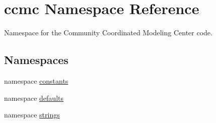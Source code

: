 \hypertarget{namespaceccmc}{\section{ccmc Namespace Reference}
\label{namespaceccmc}
}


Namespace for the Community Coordinated Modeling Center code.  


\subsection*{Namespaces}
\begin{DoxyCompactItemize}
\item 
namespace \hyperlink{namespaceccmc_1_1constants}{constants}
\item 
namespace \hyperlink{namespaceccmc_1_1defaults}{defaults}
\item 
namespace \hyperlink{namespaceccmc_1_1strings}{strings}
\end{DoxyCompactItemize}
